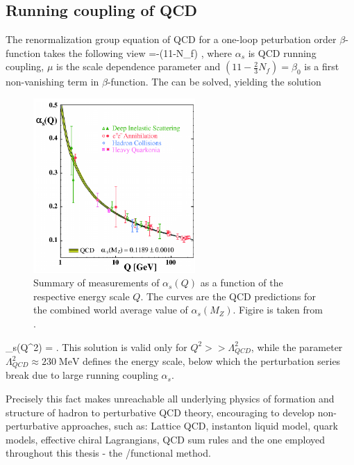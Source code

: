 	\subsection*{Running coupling of QCD}
The renormalization group equation of QCD for a one-loop peturbation order $\beta$-function takes the following view
\beqa
    \label{qcd_low:renorm_eq}
	\mu{}=-(11-N_f) \;,
\eeqa
where $\alpha_s$ is QCD running coupling, $\mu$ is the scale dependence parameter and $(11-\frac{2}{3}N_f) = \beta_0$ is a first non-vanishing term in $\beta$-function. The \Eq{\ref{qcd_low:renorm_eq}} can be solved, yielding the solution
\begin{figure}[h]
 \begin{center}
  \includegraphics[width=0.55\textwidth]{figures/running_coupling2.png}
 \end{center}
 \caption{\small 
Summary of measurements of $\alpha_s(Q)$ as a function of the respective energy scale $Q$.
The curves are the QCD predictions for the combined world average value of $\alpha_s(M_Z)$. Figire is taken from \cite{Bethke:2006ac}.
}
\label{fig:running_coupling} 
\end{figure}
\beqa
	\alpha_s(Q^2) = \;.
\eeqa
This solution is valid only for $Q^2 >> \Lambda^2_{QCD}$, while the parameter $\Lambda^2_{QCD} \approx 230 \; \text{MeV}$ defines the energy scale,
below which the perturbation series break due to large running coupling $\alpha_s$. 

Precisely this fact makes unreachable all underlying physics of formation and structure of hadron to perturbative QCD theory, encouraging to develop non-perturbative approaches, such as: Lattice QCD, instanton liquid model, quark models, effective chiral Lagrangians, QCD sum rules and the one employed throughout this thesis - the \DS/\BS  functional method.

